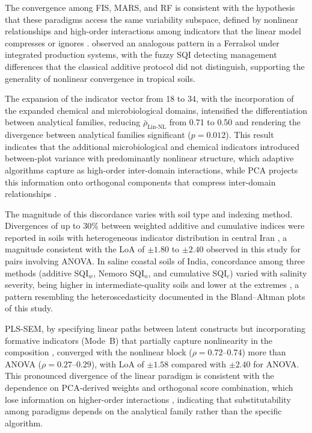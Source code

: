 \documentclass[pdflatex,sn-basic]{sn-jnl}%
\begin{document}
The convergence among FIS, MARS, and RF is consistent with the hypothesis that these paradigms access the same variability subspace, defined by nonlinear relationships and high-order interactions among indicators that the linear model compresses or ignores \citep{Zeraatpisheh2020,Wadoux2020}. \cite{DosSantos2021} observed an analogous pattern in a Ferralsol under integrated production systems, with the fuzzy SQI detecting management differences that the classical additive protocol did not distinguish, supporting the generality of nonlinear convergence in tropical soils.

The expansion of the indicator vector from 18 to 34, with the incorporation of the expanded chemical and microbiological domains, intensified the differentiation between analytical families, reducing $\bar{\rho}_{\text{Lin-NL}}$ from 0.71 to 0.50 and rendering the divergence between analytical families significant ($p = 0.012$). This result indicates that the additional microbiological and chemical indicators introduced between-plot variance with predominantly nonlinear structure, which adaptive algorithms capture as high-order inter-domain interactions, while PCA projects this information onto orthogonal components that compress inter-domain relationships \citep{Rezaee2020}.

The magnitude of this discordance varies with soil type and indexing method. Divergences of up to 30\% between weighted additive and cumulative indices were reported in soils with heterogeneous indicator distribution in central Iran \citep{Emami2024}, a magnitude consistent with the LoA of $\pm 1.80$ to $\pm 2.40$ observed in this study for pairs involving ANOVA. In saline coastal soils of India, concordance among three methods (additive SQI$_w$, Nemoro SQI$_n$, and cumulative SQI$_c$) varied with salinity severity, being higher in intermediate-quality soils and lower at the extremes \citep{Mahajan2021}, a pattern resembling the heteroscedasticity documented in the Bland--Altman plots of this study.

PLS-SEM, by specifying linear paths between latent constructs but incorporating formative indicators (Mode~B) that partially capture nonlinearity in the composition \citep{Diamantopoulos2008}, converged with the nonlinear block ($\rho = 0.72$--$0.74$) more than ANOVA ($\rho = 0.27$--$0.29$), with LoA of $\pm 1.58$ compared with $\pm 2.40$ for ANOVA. This pronounced divergence of the linear paradigm is consistent with the dependence on PCA-derived weights and orthogonal score combination, which lose information on higher-order interactions \citep{Andrews2002,Bunemann2018}, indicating that substitutability among paradigms depends on the analytical family rather than the specific algorithm.
\end{document}
